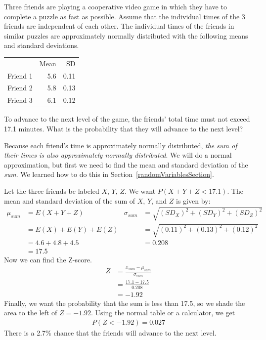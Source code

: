 \begin{examplewrap}
\begin{nexample}{Three friends are playing a cooperative video game in which they have to complete a puzzle as fast as possible. Assume that the individual times of the 3 friends are independent of each other. The individual times of the friends in similar puzzles are approximately normally distributed with the following means and standard deviations. 
\begin{center}
\begin{tabular}{lrr}
& Mean &  SD \\
Friend 1 	& 5.6 & 0.11  \\
Friend 2 	& 5.8  & 0.13 \\
Friend 3 	& 6.1  & 0.12  
\end{tabular}
\end{center}
To advance to the next level of the game, the friends' total time must not exceed 17.1 minutes. What is the probability that they will advance to the next level?}
Because each friend's time is approximately normally distributed, \emph{the sum of their times is also approximately normally distributed}. We will do a normal approximation, but first we need to find the mean and standard deviation of the \emph{sum}. We learned how to do this in Section~\ref{randomVariablesSection}.

Let the three friends be labeled $X$, $Y$, $Z$. We want $P(X + Y + Z < 17.1)$. The mean and standard deviation of the sum of $X$, $Y$, and $Z$ is given by:
\begin{align*}
\mu_{sum} &= E(X+Y+Z)
	& \sigma_{sum}&= \sqrt{(SD_X)^2+(SD_Y)^2 + (SD_Z)^2} \\
&= E(X) + E(Y) + E(Z)
	& &= \sqrt{(0.11)^2+(0.13)^2+(0.12)^2}\\
&=4.6+4.8+4.5
	& &= 0.208 \\
&=17.5
\end{align*}
Now we can find the Z-score. 
\begin{align*}
Z &= \frac{x_{sum}-\mu_{sum}}{\sigma_{sum}} \\
&=\frac{17.1-17.5}{0.208} \\
&=-1.92
\end{align*}
Finally, we want the probability that the sum is less than 17.5, so we shade the area to the left of $Z = -1.92$. Using the normal table or a calculator, we get
\begin{align*}
P(Z < -1.92) = 0.027
\end{align*}
There is a 2.7\% chance that the friends will advance to the next level.
\end{nexample}
\end{examplewrap}

